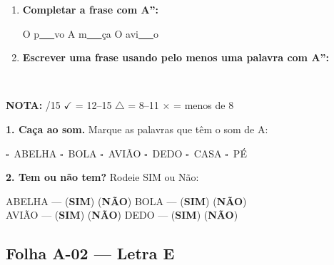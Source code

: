 \begin{exercicio}
\begin{enumerate}[resume]
  \item \textbf{Completar a frase com A'':}
  \begin{center}
  O p\underline{~~~}vo \quad A m\underline{~~~}ça \quad O avi\underline{~~~}o
  \end{center}

  \item \textbf{Escrever uma frase usando pelo menos uma palavra com A'':}
  \begin{center}
  \underline{\hspace{12cm}} \\
  \underline{\hspace{12cm}}
  \end{center}
\end{enumerate}

\noindent\textbf{NOTA:} \underline{\hspace{1cm}}/15 \quad $\checkmark$ = 12--15 \quad $\triangle$ = 8--11 \quad $\times$ = menos de 8
\end{exercicio}

\begin{somletra}[title={\faMusic~Atividade de Som da Vogal --- B\^onus (n\~ao vale nota)}]
\textbf{1. Ca\c{c}a ao som.} Marque as palavras que t\^e{}m o som de A:
\begin{center}
$\square$~ABELHA \quad $\square$~BOLA \quad $\square$~AVI\~AO \quad $\square$~DEDO \quad $\square$~CASA \quad $\square$~P\'E
\end{center}

\textbf{2. Tem ou n\~ao{} tem?} Rodeie SIM ou N\~ao:
\begin{center}
ABELHA --- (\textbf{SIM}) (\textbf{N\~AO}) \quad BOLA --- (\textbf{SIM}) (\textbf{N\~AO}) \\ AVI\~AO --- (\textbf{SIM}) (\textbf{N\~AO}) \quad DEDO --- (\textbf{SIM}) (\textbf{N\~AO})
\end{center}
\end{somletra}



\subsection{Folha A-02 --- Letra E}

